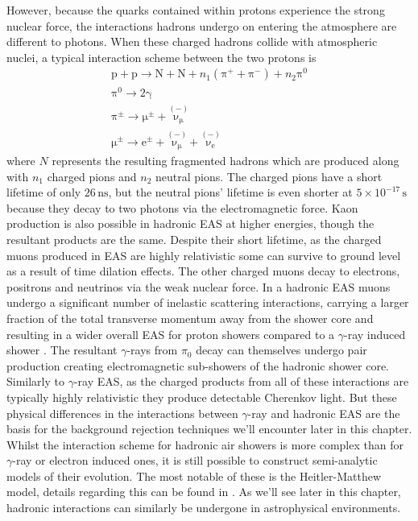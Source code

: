 However, because the quarks contained within protons experience the strong nuclear force, the   interactions hadrons undergo on entering the atmosphere are different to photons. When these charged hadrons collide with atmospheric nuclei, a typical interaction scheme between the two protons \cite{EAS} is
\begin{gather*}
\mathrm{p}+\mathrm{p}\rightarrow \mathrm{N}+\mathrm{N}+n_1 (\mathrm{\pi^+ + \pi^- })+n_2\mathrm{\pi^0} \\
\mathrm{\pi^0} \rightarrow \mathrm{2\gamma} \\
\mathrm{\mathrm{\pi^{\pm}}} \rightarrow \mathrm{\mu^{\pm}}+\mathrm{\overset{(-)}{\nu_{\mu}}}\\
\mathrm{\mu^{\pm}} \rightarrow \mathrm{e^{\pm}}+\mathrm{\overset{(-)}{\nu_{\mu}}}+\mathrm{\overset{(-)}{\nu_{e}}}
\end{gather*}
where $N$ represents the resulting fragmented hadrons which are produced along with $n_1$ charged pions and $n_2$ neutral pions. The charged pions have a short lifetime of only $\mathrm{26\,ns}$, but the neutral pions' lifetime is even shorter at $5 \times 10^{-17}\,\mathrm{s}$ because they decay to two photons via the electromagnetic force. Kaon production is also possible in hadronic EAS at higher energies, though the resultant products are the same. Despite their short lifetime, as the charged muons produced in EAS are highly relativistic some can survive to ground level as a result of time dilation effects. The other charged muons decay to electrons, positrons and neutrinos via the weak nuclear force. In a hadronic EAS muons undergo a significant number of inelastic scattering interactions, carrying a larger fraction of the total transverse momentum away from the shower core and resulting in a wider overall EAS for proton showers compared to a $\gamma$-ray induced shower \cite{tomthesis}.  The resultant $\gamma$-rays from $\pi_0$ decay can themselves undergo pair production creating electromagnetic sub-showers of the hadronic shower core. Similarly to $\gamma$-ray EAS, as the charged products from all of these interactions are typically highly relativistic they produce detectable Cherenkov light. But these physical differences in the interactions between $\gamma$-ray and hadronic EAS are the basis for the background rejection techniques we'll encounter later in this chapter. Whilst the interaction scheme for hadronic air showers is more complex than for $\gamma$-ray or electron induced ones, it is still possible to construct semi-analytic models of their evolution. The most notable of these is the Heitler-Matthew model, details regarding this can be found in \cite{heitler}. As we'll see later in this chapter, hadronic interactions can similarly be undergone in astrophysical environments.
